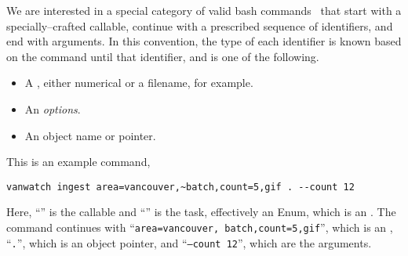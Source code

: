 We are interested in a special category of valid bash commands~\cite{shell_syntax} that start with a specially--crafted callable, continue with a prescribed sequence of identifiers, and end with arguments. In this convention, the type of each identifier is known based on the command until that identifier, and is one of the following.
%
\begin{itemize}
    \item A , either numerical or a filename, for example.
    \item An \emph{options}.
    \item An object name or pointer.
\end{itemize}
%
This is an example command,
%
\begin{verbatim}
vanwatch ingest area=vancouver,~batch,count=5,gif . --count 12
\end{verbatim}
%
Here, ``'' is the callable and ``'' is the task, effectively an Enum, which is an . The command continues with ``\texttt{area=vancouver,~batch,count=5,gif}'', which is an , ``\texttt{.}'', which is an object pointer, and ``\texttt{--count 12}'', which are the arguments.